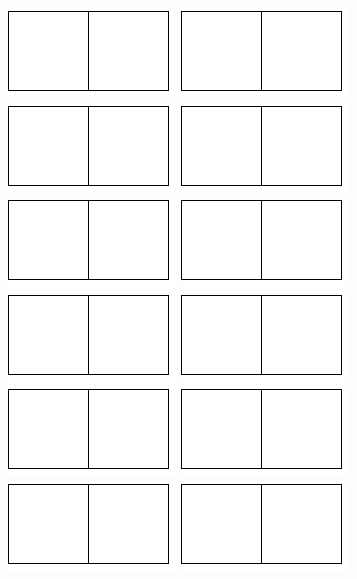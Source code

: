 \documentclass[a4paper]{oblivoir}
\begin{document}
\bigskip\noindent
\includegraphics[width=.2\textwidth]{1}\quad
\includegraphics[width=.2\textwidth]{1}\quad
\includegraphics[width=.2\textwidth]{1}\quad
\includegraphics[width=.2\textwidth]{1}\\[5pt]
\includegraphics[width=.2\textwidth]{1}\quad
\includegraphics[width=.2\textwidth]{1}\quad
\includegraphics[width=.2\textwidth]{1}\quad
\includegraphics[width=.2\textwidth]{1}\\[5pt]
\includegraphics[width=.2\textwidth]{1}\quad
\includegraphics[width=.2\textwidth]{1}\quad
\includegraphics[width=.2\textwidth]{1}\quad
\includegraphics[width=.2\textwidth]{1}
\end{document}
